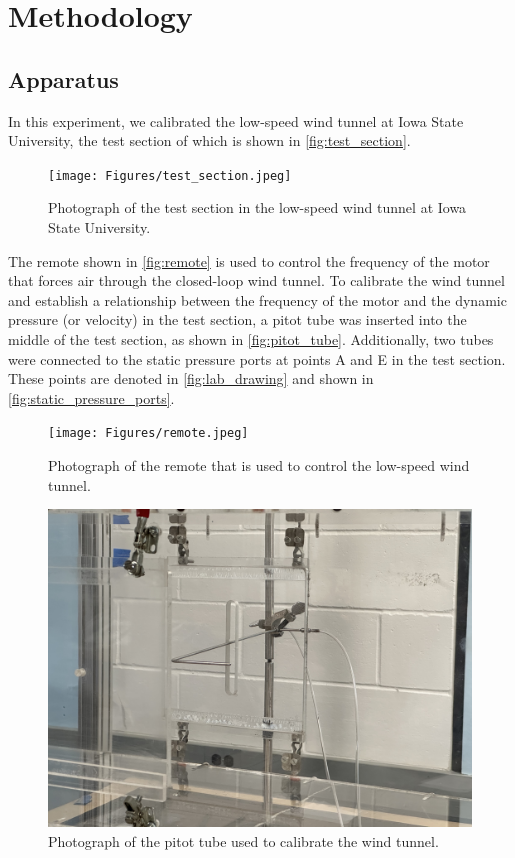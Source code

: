 \chapter{Methodology}
\label{cp:methodology}
\section{Apparatus}

In this experiment, we calibrated the low-speed wind tunnel at Iowa State University, the test section of which is shown in \autoref{fig:test_section}.

\begin{figure}[htpb]
    \centering
    \texttt{[image: Figures/test\_section.jpeg]}
    \caption[Photograph of the test section in the low-speed wind tunnel]{Photograph of the test section in the low-speed wind tunnel at Iowa State University.}
    \label{fig:test_section}
\end{figure}

The remote shown in \autoref{fig:remote} is used to control the frequency of the motor that forces air through the closed-loop wind tunnel. To calibrate the wind tunnel and establish a relationship between the frequency of the motor and the dynamic pressure (or velocity) in the test section, a pitot tube was inserted into the middle of the test section, as shown in \autoref{fig:pitot_tube}. Additionally, two tubes were connected to the static pressure ports at points A and E in the test section. These points are denoted in \autoref{fig:lab_drawing} and shown in \autoref{fig:static_pressure_ports}.

\begin{figure}[htpb]
    \centering
    \texttt{[image: Figures/remote.jpeg]}
    \caption[Photograph of the wind tunnel remote]{Photograph of the remote that is used to control the low-speed wind tunnel.}
    \label{fig:remote}
\end{figure}

\begin{figure}[htpb]
    \centering
    \includegraphics[width=0.6\linewidth]{Figures/real_pitot_tube.jpeg}
    \caption[Photograph of the pitot tube in the wind tunnel]{Photograph of the pitot tube used to calibrate the wind tunnel.}
    \label{fig:pitot_tube}
\end{figure}

